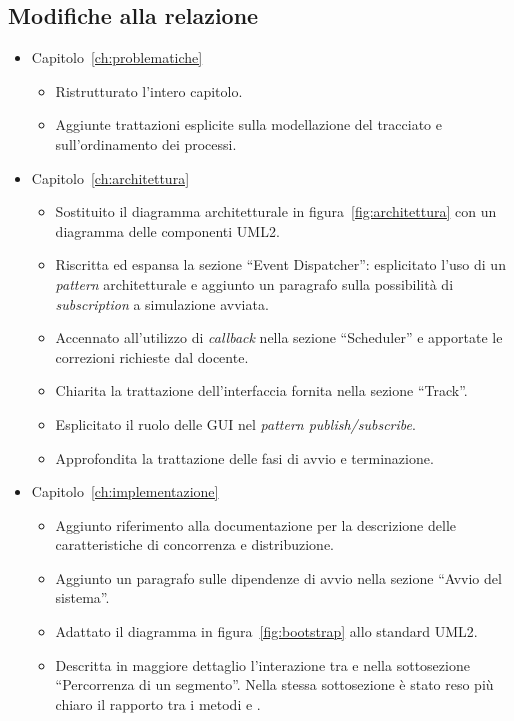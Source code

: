 \subsection*{Modifiche alla relazione}
\begin{itemize}
\item Capitolo~\ref{ch:problematiche}
	\begin{itemize}
	\item Ristrutturato l'intero capitolo.
	\item Aggiunte trattazioni esplicite sulla modellazione del tracciato e sull'ordinamento dei processi.
	\end{itemize}
\item Capitolo~\ref{ch:architettura}
	\begin{itemize}
	\item Sostituito il diagramma architetturale in figura~\ref{fig:architettura} con un diagramma delle componenti UML2.
	\item Riscritta ed espansa la sezione ``Event Dispatcher'': esplicitato l'uso di un \textit{pattern} architetturale e aggiunto un paragrafo sulla possibilità di \textit{subscription} a simulazione avviata.
	\item Accennato all'utilizzo di \textit{callback} nella sezione ``Scheduler'' e apportate le correzioni richieste dal docente.
	\item Chiarita la trattazione dell'interfaccia fornita nella sezione ``Track''.
	\item Esplicitato il ruolo delle GUI nel \textit{pattern \mbox{publish/subscribe}}.
	\item Approfondita la trattazione delle fasi di avvio e terminazione.
	\end{itemize}
\item Capitolo~\ref{ch:implementazione}
	\begin{itemize}
	\item Aggiunto riferimento alla documentazione \Erlang{} per la descrizione delle caratteristiche di concorrenza e distribuzione.
	\item Aggiunto un paragrafo sulle dipendenze di avvio nella sezione ``Avvio del sistema''.
	\item Adattato il diagramma in figura~\ref{fig:bootstrap} allo standard UML2.
	\item Descritta in maggiore dettaglio l'interazione tra \car{} e \track{} nella sottosezione ``Percorrenza di un segmento''. Nella stessa sottosezione è stato reso più chiaro il rapporto tra i metodi  e .

\end{itemize}
\end{itemize}
